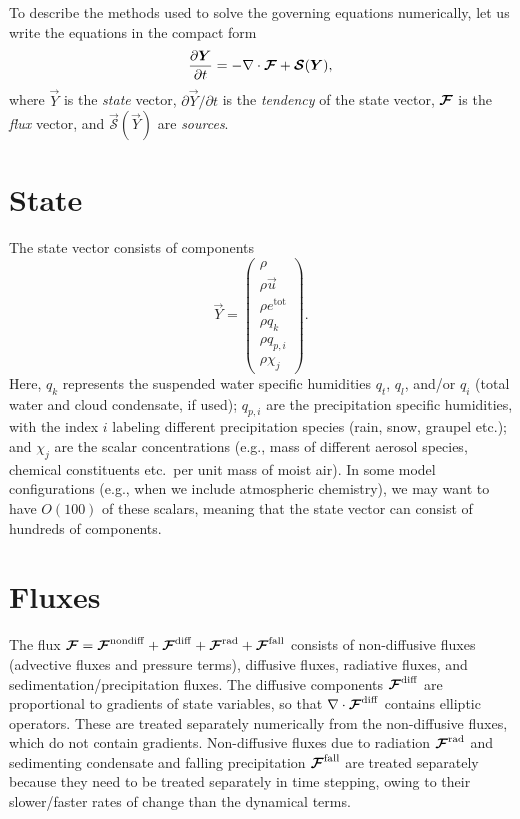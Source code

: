 \documentclass{report}
\begin{document}
To describe the methods used to solve the governing equations numerically, let us write the equations in the compact form 
\begin{equation}\label{e:eom_compact}
\frac{\partial \boldsymbol{{Y}}}{\partial t}  =  - \nabla \cdot \boldsymbol{{\mathcal{F}}} + \boldsymbol{{\mathcal{S}}}(\boldsymbol{{Y}}),
\end{equation}
where $\vec{Y}$ is the \emph{state} vector, $\partial\vec{Y}/\partial t$ is the \emph{tendency} of the state vector, $\boldsymbol{{\mathcal{F}}}$ is the \emph{flux} vector, and $\vec{\mathcal{S}}(\vec{Y})$ are \emph{sources}. 

\section{State}

The state vector consists of components
\begin{equation}\label{e:state}
\vec{Y}=\left( \begin{array}{c}
\rho \\
\rho\vec{u} \\
\rho e^{\mathrm{tot}}\\
\rho q_k\\
\rho q_{p,i}\\
\rho \chi_j
\end{array}
\right).
\end{equation}
Here, $q_k$ represents the suspended water specific humidities $q_t$, $q_l$, and/or $q_i$ (total water and cloud condensate, if used); $q_{p,i}$ are the precipitation specific humidities, with the index $i$ labeling different precipitation species (rain, snow, graupel etc.); and $\chi_j$ are the scalar concentrations (e.g., mass of different aerosol species, chemical constituents etc.\ per unit mass of moist air). In some model configurations (e.g., when we include atmospheric chemistry), we may want to have $O(100)$ of these scalars, meaning that the state vector can consist of hundreds of components.

\section{Fluxes}\label{sec:fluxes}

The flux $\boldsymbol{{\mathcal{F}}}=\boldsymbol{{\mathcal{F}}}^{\mathrm{nondiff}} + \boldsymbol{{\mathcal{F}}}^{\mathrm{diff}} + \boldsymbol{{\mathcal{F}}}^{\mathrm{rad}} + \boldsymbol{{\mathcal{F}}}^{\mathrm{fall}}$ consists of non-diffusive fluxes (advective fluxes and pressure terms), diffusive fluxes, radiative fluxes, and sedimentation/precipitation fluxes. The diffusive components $\boldsymbol{{\mathcal{F}}}^{\mathrm{diff}}$ are proportional to gradients of state variables, so that $\nabla \cdot \boldsymbol{{\mathcal{F}}}^{\mathrm{diff}}$ contains elliptic operators. These are treated separately numerically from the non-diffusive fluxes, which do not contain gradients. Non-diffusive fluxes due to radiation $\boldsymbol{{\mathcal{F}}}^{\mathrm{rad}}$ and sedimenting condensate and falling precipitation $\boldsymbol{{\mathcal{F}}}^{\mathrm{fall}}$ are treated separately because they need to be treated separately in time stepping, owing to their slower/faster rates of change than the dynamical terms. 
\end{document}
